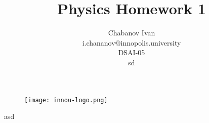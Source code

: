 \documentclass{article}
\begin{document}
\begin{titlepage}

    \begin{figure}[t]
        \centering
        \texttt{[image: innou-logo.png]} %
    \end{figure}
    
    asd
    \title{Physics Homework 1}
    \author{Chabanov Ivan\\i.chananov@innopolis.university\\DSAI-05\\sd}
    \maketitle

\end{titlepage}
\end{document}
